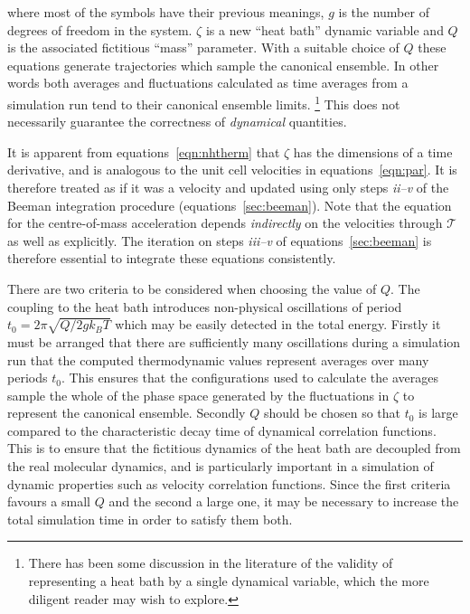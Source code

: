 \documentclass[a4paper,twoside]{report}
\begin{document}
\noindent
where most of the symbols have their previous meanings, $g$ is the
number of degrees of freedom in the system. $\zeta$ is a new ``heat
bath'' dynamic variable and $Q$ is the associated fictitious ``mass''
parameter.  With a suitable choice of $Q$ these equations generate
trajectories which sample the canonical ensemble\cite{nose:84}.  In
other words both averages and fluctuations calculated as time averages
from a simulation run tend to their canonical ensemble limits.%
\footnote{There has been some discussion in the literature of the
  validity of representing a heat bath by a single dynamical variable,
  which the more diligent reader may wish to
  explore\cite{cho:93,nose:91}.} This does not necessarily guarantee
the correctness of \emph{dynamical} quantities.

It is apparent from equations~\ref{eqn:nhtherm} that $\zeta$ has the
dimensions of a time derivative, and is analogous to the unit cell
velocities in equations~\ref{eqn:par}.  It is therefore treated as if
it was a velocity and updated using only steps \emph{ii--v} of the
Beeman integration procedure (equations~\ref{sec:beeman}).  Note that
the equation for the centre-of-mass acceleration depends
\emph{indirectly} on the velocities through $\mathcal{T}$ as well as
explicitly.  The iteration on steps \emph{iii--v} of
equations~\ref{sec:beeman} is therefore essential to integrate these
equations consistently.

There are two criteria to be considered when choosing the value of
$Q$.  The coupling to the heat bath introduces non-physical
oscillations of period $t_0 = 2 \pi \sqrt{Q / 2 g k_B T}$ which may be
easily detected in the total energy\cite{nose:91}.  Firstly it must be
arranged that there are sufficiently many oscillations during a
simulation run that the computed thermodynamic values represent
averages over many periods $t_0$. This ensures that the configurations
used to calculate the averages sample the whole of the phase space
generated by the fluctuations in $\zeta$ to represent the canonical
ensemble.  Secondly $Q$ should be chosen so that $t_0$ is large
compared to the characteristic decay time of dynamical correlation
functions. This is to ensure that the fictitious dynamics of the heat
bath are decoupled from the real molecular dynamics, and is
particularly important in a simulation of dynamic
properties\cite{cho:92} such as velocity correlation functions. Since
the first criteria favours a small $Q$ and the second a large one, it
may be necessary to increase the total simulation time in order to
satisfy them both.
\end{document}
